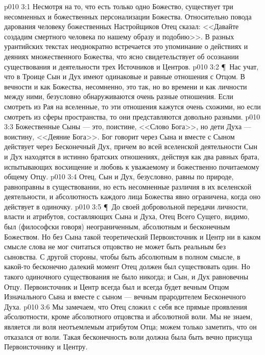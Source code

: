 \vs p010 3:1 Несмотря на то, что есть только одно Божество, существует три несомненных и божественных персонализации Божества. Относительно повода дарования человеку божественных Настройщиков Отец сказал: <<Давайте создадим смертного человека по нашему образу и подобию>>. В разных урантийских текстах неоднократно встречается это упоминание о действиях и деяниях множественного Божества, что ясно свидетельствует об осознании существования и деятельности трех Источников и Центров.
\vs p010 3:2 \P\ Нас учат, что в Троице Сын и Дух имеют одинаковые и равные отношения с Отцом. В вечности и как Божества, несомненно, это так, но во времени и как личности между ними, безусловно обнаруживаются очень разные отношения. Если смотреть из Рая на вселенные, то эти отношения кажутся очень схожими, но если смотреть из сферы пространства, то они представляются довольно разными.
\vs p010 3:3 Божественные Сыны --- это, поистине, <<Слово Бога>>, но дети Духа --- воистину, <<Деяние Бога>>. Бог говорит через Сына и вместе с Сыном действует через Бесконечный Дух, причем во всей вселенской деятельности Сын и Дух находятся в истинно братских отношениях, действуя как два равных брата, испытывающих восхищение и любовь к уважаемому и божественно почитаемому общему Отцу.
\vs p010 3:4 Отец, Сын и Дух, безусловно, равны по природе, равноправны в существовании, но есть несомненные различия в их вселенской деятельности, и абсолютность каждого лица Божества явно ограничена, когда оно действует в одиночку.
\vs p010 3:5 \P\ До своей добровольной передачи личности, власти и атрибутов, составляющих Сына и Духа, Отец Всего Сущего, видимо, был (философски говоря) неограниченным, абсолютным и бесконечным Божеством. Но без Сына такой теоретический Первоисточник и Центр ни в каком смысле слова не мог считаться  отцовство не может быть реальным без сыновства. С другой стороны, чтобы быть абсолютным в полном смысле, в какой\hyp{}то бесконечно далекий момент Отец должен был существовать один. Но такого одиночного существования не было никогда; и Сын, и Дух равновечны Отцу. Первоисточник и Центр всегда был и всегда будет вечным Отцом Изначального Сына и вместе с сыном --- вечным прародителем Бесконечного Духа.
\vs p010 3:6 Мы замечаем, что Отец сложил с себя все прямые проявления абсолютности, кроме абсолютного отцовства и абсолютной воли. Мы не знаем, является ли воля неотъемлемым атрибутом Отца; можем только заметить, что он  отказался от воли. Такая бесконечность воли должна была быть вечно присуща Первоисточнику и Центру.
